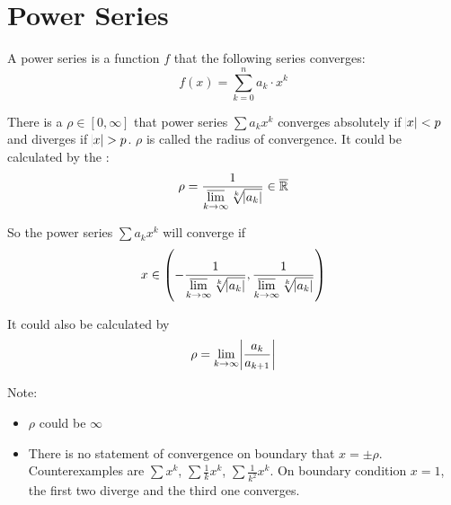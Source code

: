 
\section{Power Series}

\begin{definition}
    A power series is a function $f$ that the following series converges:
    \begin{equation}
        f(x) = \sum_{k=0}^n a_k \cdot x^k
    \end{equation}
\end{definition}

\begin{theorem}
    There is a $\rho \in [0, \infty]$ that power series $\sum a_k x^k$ converges absolutely if $\abs{x} < p$ and diverges if $\abs{x} > p$. $\rho$ is called the radius of convergence. It could be calculated by the :
    \begin{equation}
        \rho = \frac{1}{\displaystyle \varlimsup_{k \rightarrow \infty} \sqrt[k]{\abs{a_k}} } \in \overline{\mathbb{R}}
    \end{equation}
    
    So the power series $\sum a_k x^k$ will converge if
    \begin{equation}
        x \in \left(- \frac{1}{\displaystyle \varlimsup_{k \rightarrow \infty} \sqrt[k]{\abs{a_k}} }, \frac{1}{\displaystyle \varlimsup_{k \rightarrow \infty} \sqrt[k]{\abs{a_k}} } \right)
    \end{equation}
    
    It could also be calculated by 
    \begin{equation}
        \rho = \lim_{k \rightarrow \infty} \abs{\frac{a_k}{a_{k+1}}}
    \end{equation}
    
    Note:
    \begin{itemize}
        \item $\rho$ could be $\infty$
        \item There is no statement of convergence on boundary that $x = \pm \rho$. Counterexamples are $\sum x^k$, $\sum \frac{1}{k} x^k$, $\sum \frac{1}{k^2} x^k$. On boundary condition $x=1$, the first two diverge and the third one converges.
    \end{itemize}
    
     
\end{theorem}
